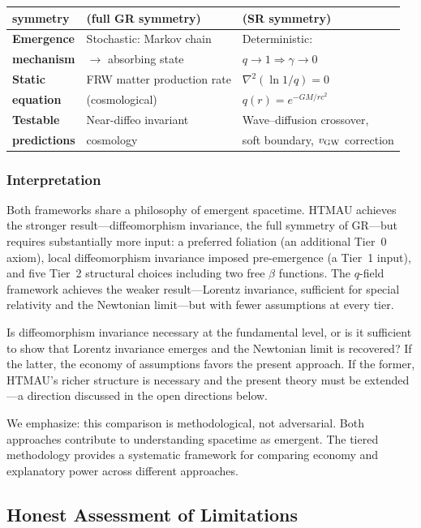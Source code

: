 \documentclass[aps,prd,twocolumn,showpacs,superscriptaddress,preprintnumbers]{revtex4-2}
\begin{document}
\begin{table}[h]
\begin{tabular}{p{}p{}p{}}
\textbf{symmetry} & (full GR symmetry) & (SR symmetry) \\
\midrule
\textbf{Emergence} & Stochastic: Markov chain & Deterministic: \\
\textbf{mechanism} & $\to$ absorbing state & $q\to1 \Rightarrow \gamma\to0$ \\
\midrule
\textbf{Static} & FRW matter production rate & $\nabla^2(\ln 1/q)=0$ \\
\textbf{equation} & (cosmological) & $q(r)=e^{-GM/rc^2}$ \\
\midrule
\textbf{Testable} & Near-diffeo invariant & Wave--diffusion crossover, \\
\textbf{predictions} & cosmology & soft boundary, $v_{\rm GW}$ correction \\
\bottomrule
\end{tabular}
\end{table}

\subsubsection{Interpretation}

Both frameworks share a philosophy of emergent spacetime.
HTMAU achieves the stronger result---diffeomorphism invariance, the full symmetry of GR---but requires substantially more input: a preferred foliation (an additional Tier~0 axiom), local diffeomorphism invariance imposed pre-emergence (a Tier~1 input), and five Tier~2 structural choices including two free $\beta$ functions.
The $q$-field framework achieves the weaker result---Lorentz invariance, sufficient for special relativity and the Newtonian limit---but with fewer assumptions at every tier.

Is diffeomorphism invariance necessary at the fundamental level, or is it sufficient to show that Lorentz invariance emerges and the Newtonian limit is recovered?
If the latter, the economy of assumptions favors the present approach.
If the former, HTMAU's richer structure is necessary and the present theory must be extended---a direction discussed in the open directions below.

We emphasize: this comparison is methodological, not adversarial.
Both approaches contribute to understanding spacetime as emergent.
The tiered methodology provides a systematic framework for comparing economy and explanatory power across different approaches.

\subsection{Honest Assessment of Limitations}
\end{document}
